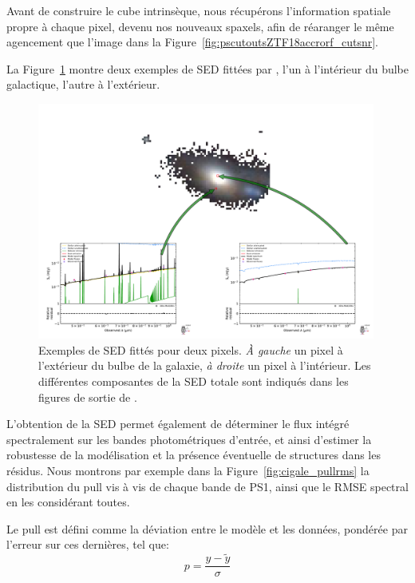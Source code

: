 \documentclass[../main/main.tex]{subfiles}
\begin{document}
Avant de construire le cube intrinsèque, nous récupérons l'information
spatiale propre à chaque pixel, devenu nos nouveaux spaxels, afin de
réaranger le même agencement que l'image dans la
Figure~\ref{fig:pscutoutsZTF18accrorf_cutsnr}.

La Figure~\ref{fig:cigalesinglespectra} montre deux exemples de SED
fittées par \cigale, l'un à l'intérieur du bulbe galactique, l'autre à l'extérieur.

\begin{figure}[ht]
  \centering
  \includegraphics[width=0.99\textwidth]{../figures/05_sedfit/cigalesinglespectra.png}
  \caption[Exemples de SED fittés]{Exemples de SED fittés pour deux
    pixels. \textit{À gauche} un pixel à l'extérieur du bulbe de la
    galaxie, \textit{à droite} un pixel à l'intérieur. Les différentes
    composantes de la SED totale sont indiqués dans les figures de
    sortie de \cigale.}
  \label{fig:cigalesinglespectra}
\end{figure}

L'obtention de la SED permet également de déterminer le flux intégré spectralement sur
les bandes photométriques d'entrée, et ainsi d'estimer la robustesse de
la modélisation et la présence éventuelle de structures dans les résidus. Nous montrons par exemple dans la
Figure~\ref{fig:cigale_pullrms} la distribution du pull vis à vis de
chaque bande de PS1, ainsi que le RMSE spectral en les considérant
toutes.

Le pull est défini comme la déviation entre le modèle et les données,
pondérée par l'erreur sur ces dernières, tel que:
\begin{equation}
  \label{eq:pull}
  p = \frac{y - \widetilde{y}}{\sigma}
\end{equation}
\end{document}
